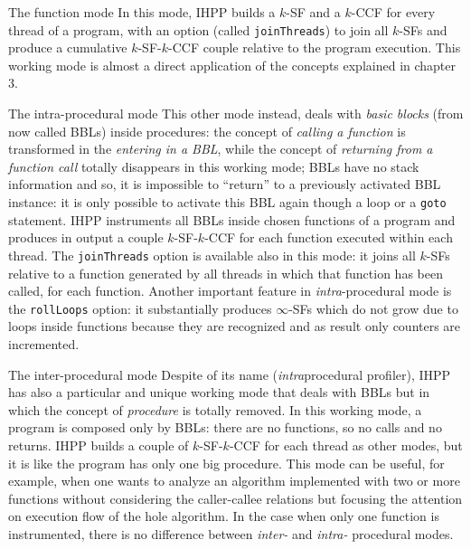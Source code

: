 \documentclass[a4paper,11pt]{report}
\begin{document}
\begin{paragraph}{The function mode}
In this mode, IHPP builds a $k$-SF and a $k$-CCF for every thread of a program,
with an option (called \verb|joinThreads|) to join all $k$-SFs and produce a cumulative $k$-SF-$k$-CCF couple relative to the program execution.
This working mode is almost a direct application of the concepts explained in chapter 3. 
\end{paragraph}

\begin{paragraph}{The intra-procedural mode}
This other mode instead, deals with \emph{basic blocks} (from now called BBLs) inside procedures: the concept of \emph{calling a function} is transformed in the \emph{entering in a BBL}, while the concept of \emph{returning from a function call} totally disappears in this working mode; BBLs have no stack information and so, it is impossible to ``return'' to a previously activated BBL instance: it is only possible to activate this BBL again though a loop or a \verb|goto| statement.
IHPP instruments all BBLs inside chosen functions of a program and produces in output a couple $k$-SF-$k$-CCF for each function executed within each thread. The \verb|joinThreads| option is available also in this mode: it joins all $k$-SFs relative to a function generated by all threads in which that function has been called, for each function.
Another important feature in \emph{intra}-procedural mode is the \verb|rollLoops| option: it substantially produces $\infty$-SFs which do not grow due to loops inside functions because they are recognized and as result only counters are incremented. 
\end{paragraph}

\begin{paragraph}{The inter-procedural mode}
Despite of its name (\emph{intra}procedural profiler), IHPP has also a particular and unique working mode that deals with BBLs but in which the concept of \emph{procedure} is totally removed. In this working mode, a program is composed only by BBLs: there are no functions, so no calls and no returns. IHPP builds a couple of $k$-SF-$k$-CCF for each thread as other modes, but it is like the program has only one big procedure. This mode can be useful, for example, when one wants to analyze an algorithm implemented with two or more functions without considering the caller-callee relations but focusing the attention on execution flow of the hole algorithm. In the case when only one function is instrumented, there is no difference between \emph{inter-} and \emph{intra-} procedural modes.
\end{paragraph}
\end{document}
